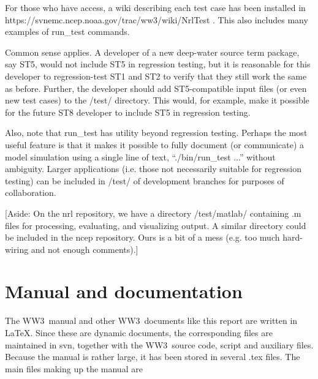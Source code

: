 \documentclass[12pt]{article}
\newcommand{\ws}{WW3}
\newcommand{\file}{\sf}
\newcommand{\pb}{\strut \vfill \pagebreak}
\newcommand{\newsec}{\setcounter{equation}{0}
                      \setcounter{myfigno}{0}
                      \setcounter{mytabno}{0}}
\newcounter{myfigno}[section]
\newcounter{mytabno}[section]
\begin{document}
For those who have access, a wiki describing each test case has been installed
in {\file https://svnemc.ncep.noaa.gov/trac/ww3/wiki/NrlTest }. This also includes
many examples of {\file run\_test} commands.

Common sense applies. A developer of a new deep-water source term package, say
ST5, would not include ST5 in regression testing, but it is reasonable for
this developer to regression-test ST1 and ST2 to verify that they still work
the same as before. Further, the developer should add ST5-compatible input
files (or even new test cases) to the {\file/test/} directory. This would, for
example, make it possible for the future ST8 developer to include ST5 in
regression testing.

Also, note that {\file run\_test} has utility beyond regression testing. Perhaps the
most useful feature is that it makes it possible to fully document (or
communicate) a model simulation using a single line of text, ``{\file ./bin/run\_test}
...'' without ambiguity. Larger applications (i.e. those not necessarily
suitable for regression testing) can be included in {\file/test/} of development
branches for purposes of collaboration.

[Aside: On the nrl repository, we have a directory {\file/test/matlab/} containing {\file.m} files
  for processing, evaluating, and visualizing output. A similar directory
  could be included in the ncep repository. Ours is a bit of a mess (e.g. too
  much hard-wiring and not enough comments).]


\pb
\section{Manual and documentation} \label{sec:man}
\newsec

The \ws\ manual and other \ws\ documents like this report are written in
\LaTeX. Since these are dynamic documents, the corresponding files are
maintained in svn, together with the \ws\ source code, script and auxiliary
files. Because the manual is rather large, it has been stored in several
{\file .tex} files. The main files making up the manual are
\end{document}
